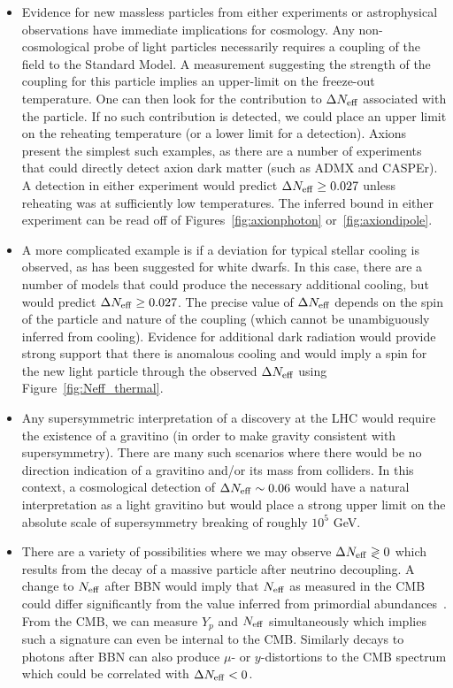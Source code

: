 \begin{itemize}
\item Evidence for new massless particles from either experiments or astrophysical observations have immediate implications for cosmology.  Any non-cosmological probe of light particles necessarily requires a coupling of the field to the Standard Model.  A measurement suggesting the strength of the coupling for this particle implies an upper-limit on the freeze-out temperature.  One can then look for the contribution to $\Delta N_{\rm eff}$ associated with the particle.  If no such contribution is detected, we could place an upper limit on the reheating temperature (or a lower limit for a detection).  Axions present the simplest such examples, as there are a number of experiments that could directly detect axion dark matter (such as ADMX and CASPEr).  A detection in either experiment would predict $\Delta N_{\rm eff} \geq 0.027$ unless reheating was at sufficiently low temperatures.  The inferred bound in either experiment can be read off of Figures~\ref{fig:axionphoton} or~\ref{fig:axiondipole}.

\item A more complicated example is if a deviation for typical stellar cooling is observed, as has been suggested for white dwarfs.  In this case, there are a number of models that could produce the necessary additional cooling, but would predict $\Delta N_{\rm eff} \geq 0.027$.  The precise value of $\Delta N_{\rm eff}$ depends on the spin of the particle and nature of the coupling (which cannot be unambiguously inferred from cooling).  Evidence for additional dark radiation would provide strong support that there is anomalous cooling and would imply a spin for the new light particle through the observed $\Delta N_{\rm eff}$ using Figure~\ref{fig:Neff_thermal}.

\item Any supersymmetric interpretation of a discovery at the LHC  would require the existence of a gravitino (in order to make gravity consistent with supersymmetry).  There are many such scenarios where there would be no direction indication of a gravitino and/or its mass from colliders.  In this context, a cosmological detection of $\Delta N_{\rm eff} \sim 0.06$ would have a natural interpretation as a light gravitino but would place a strong upper limit on the absolute scale of supersymmetry breaking of roughly $10^5$ GeV.  

\item There are a variety of possibilities where we may observe $\Delta N_{\rm eff} \gtrless 0$ which results from the decay of a massive particle after neutrino decoupling.  A change to $N_{\rm eff}$ after BBN would imply that $N_{\rm eff}$ as measured in the CMB could differ significantly from the value inferred from primordial abundances~\cite{Fischler:2010xz}.  From the CMB, we can measure $Y_p$ and $N_{\rm eff}$ simultaneously which implies such a signature can even be internal to the CMB.  Similarly decays to photons after BBN can also produce $\mu$- or $y$-distortions to the CMB spectrum which could be correlated with $\Delta N_{\rm eff} < 0$.
\end{itemize}


